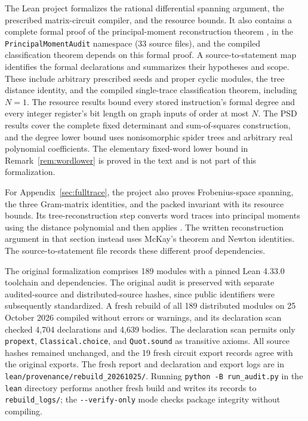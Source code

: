 \documentclass[11pt,letterpaper]{article}
\theoremstyle{definition}\newtheorem{definition}[theorem]{Definition}
\theoremstyle{remark}\newtheorem{remark}[theorem]{Remark}
\begin{document}
The Lean project formalizes the rational differential spanning argument, the prescribed matrix-circuit compiler, and the resource bounds. It also contains a complete formal proof of the principal-moment reconstruction theorem \cite[Theorem 5.4]{LuLi}, in the \texttt{PrincipalMomentAudit} namespace (33 source files), and the compiled classification theorem depends on this formal proof. A source-to-statement map identifies the formal declarations and summarizes their hypotheses and scope. These include arbitrary prescribed seeds and proper cyclic modules, the tree distance identity, and the compiled single-trace classification theorem, including $N=1$. The resource results bound every stored instruction's formal degree and every integer register's bit length on graph inputs of order at most $N$. The PSD results cover the complete fixed determinant and sum-of-squares construction, and the degree lower bound uses nonisomorphic spider trees and arbitrary real polynomial coefficients. The elementary fixed-word lower bound in Remark~\ref{rem:wordlower} is proved in the text and is not part of this formalization.

For Appendix~\ref{sec:fulltrace}, the project also proves Frobenius-space spanning, the three Gram-matrix identities, and the packed invariant with its resource bounds. Its tree-reconstruction step converts word traces into principal moments using the distance polynomial and then applies \cite[Theorem 5.4]{LuLi}. The written reconstruction argument in that section instead uses McKay's theorem and Newton identities. The source-to-statement file records these different proof dependencies.

The original formalization comprises 189 modules with a pinned Lean 4.33.0 toolchain and dependencies. The original audit is preserved with separate audited-source and distributed-source hashes, since public identifiers were subsequently standardized. A fresh rebuild of all 189 distributed modules on 25 October 2026 compiled without errors or warnings, and its declaration scan checked 4,704 declarations and 4,639 bodies. The declaration scan permits only \texttt{propext}, \texttt{Classical.choice}, and \texttt{Quot.sound} as transitive axioms. All source hashes remained unchanged, and the 19 fresh circuit export records agree with the original exports. The fresh report and declaration and export logs are in \texttt{lean/provenance/rebuild\_20261025/}. Running \texttt{python -B run\_audit.py} in the \texttt{lean} directory performs another fresh build and writes its records to \texttt{rebuild\_logs/}; the \texttt{-{}-verify-only} mode checks package integrity without compiling.
\end{document}
